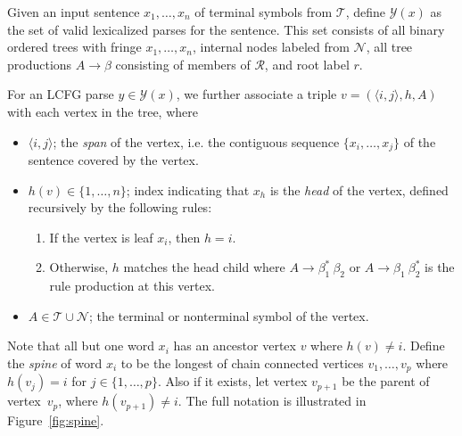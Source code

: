 \documentclass[11pt,letterpaper]{article}
\newcommand{\nonterms}{\mathcal{N}}
\newcommand{\rules}{\mathcal{R}}
\newcommand{\terms}{\mathcal{T}}
\newcommand{\Span}[1]{\langle #1 \rangle}
\newcommand{\Root}{r}
\newcommand{\RuleA}[3]{#1 \rightarrow #2^*\ #3}
\newcommand{\RuleB}[3]{#1 \rightarrow #2\ #3^*}
\begin{document}
Given an input sentence $x_1, \ldots, x_n$ of terminal symbols from $\terms$, define $\mathcal{Y}(x)$ as the set of valid lexicalized parses for the sentence. This set consists of all binary ordered trees with fringe $x_1, \ldots,  x_n$, internal nodes labeled from $\nonterms$, all tree productions  $A \rightarrow \beta$ consisting of members of $\rules$, and root label $\Root$.


For an LCFG parse $y \in \mathcal{Y}(x)$,
we further associate a triple $v = (\Span{i, j}, h, A)$ with each vertex in the tree, where



\begin{itemize}
\item $\Span{i,j}$; the \textit{span}  of the vertex, i.e. the contiguous sequence $\{x_i, \ldots, x_j\}$ of the sentence covered by the vertex.

\item $h(v) \in \{1, \ldots, n\}$; index indicating that $x_h$ is the \textit{head} of the vertex, defined recursively by the following rules:
  \begin{enumerate}
  \item  If the vertex is leaf $x_i$, then $h=i$.
  \item Otherwise,  $h$ matches the head child where $\RuleA{A}{\beta_1}{\beta_2}$ or $\RuleB{A}{\beta_1}{\beta_2}$  is the rule production at this vertex.
  \end{enumerate}

\item $A \in \terms \cup \nonterms$; the terminal or nonterminal symbol of the vertex.
\end{itemize}

Note that all but one word $x_i$ has an ancestor vertex $v$ where $h(v) \neq i$.  Define the
\textit{spine} of word $x_i$ to be the longest of chain connected vertices $v_1,
\ldots, v_p$ where $h(v_j) = i$ for $j \in \{1, \ldots, p\}$.
Also if it exists, let vertex $v_{p+1}$  be the parent of vertex~$v_p$,
where $h(v_{p+1}) \neq i$. The full notation is illustrated in Figure~\ref{fig:spine}.
\end{document}
